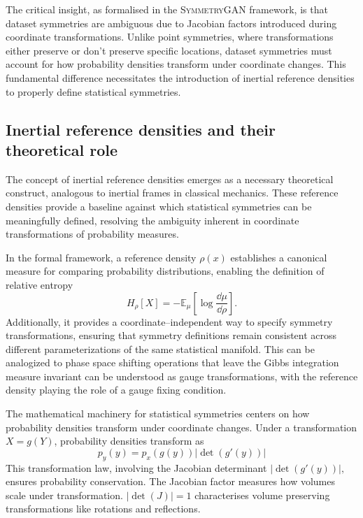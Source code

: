         The critical insight, as formalised in the \textsc{SymmetryGAN} framework, is that dataset symmetries are ambiguous due to Jacobian factors introduced during coordinate transformations.\kd{}
        Unlike point symmetries, where transformations either preserve or don't preserve specific locations, dataset symmetries must account for how probability densities transform under coordinate changes.
        This fundamental difference necessitates the introduction of inertial reference densities to properly define statistical symmetries.
        
    \subsection{Inertial reference densities and their theoretical role}
        The concept of inertial reference densities emerges as a necessary theoretical construct, analogous to inertial frames in classical mechanics.\kd{}
        These reference densities provide a baseline against which statistical symmetries can be meaningfully defined, resolving the ambiguity inherent in coordinate transformations of probability measures.

        In the formal framework, a reference density \(\rho(x)\) establishes a canonical measure for comparing probability distributions, enabling the definition of relative entropy
        \[
            H_\rho[X] = -\mathbb{E}_\mu[\log\frac{\dd\mu}{\dd\rho}].
        \]
        Additionally, it provides a coordinate--independent way to specify symmetry transformations, ensuring that symmetry definitions remain consistent across different parameterizations of the same statistical manifold.
        This can be analogized to phase space shifting operations that leave the Gibbs integration measure invariant can be understood as gauge transformations, with the reference density playing the role of a gauge fixing condition.
        
        The mathematical machinery for statistical symmetries centers on how probability densities transform under coordinate changes.
        Under a transformation \(X = g(Y)\), probability densities transform as
            \[
                p_y(y) = p_x(g(y)) |\det(g'(y))|
            \]
        This transformation law, involving the Jacobian determinant \(|\det(g'(y))|,\) ensures probability conservation.
        The Jacobian factor measures how volumes scale under transformation.
        \(|\det(J)| = 1\) characterises volume preserving transformations like rotations and reflections.

